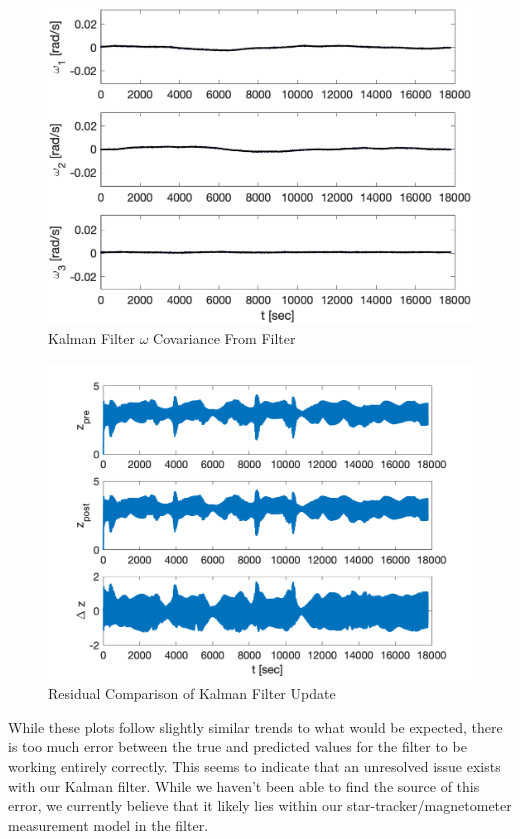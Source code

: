 \begin{figure}[H]
    \centering
    \captionsetup{ justification = centering }
    \includegraphics[width = 12cm]{Images/PS8/kalman_filter_meas_update_omega_cov_bounds.png}
    \caption{Kalman Filter $\omega$ Covariance From Filter}
    \label{fig:kalman_omega_cov}
\end{figure}

\begin{figure}[H]
    \centering
    \captionsetup{ justification = centering }
    \includegraphics[width = 12cm]{Images/PS8/kalman_filter_meas_update_residual_comparison.png}
    \caption{Residual Comparison of Kalman Filter Update}
    \label{fig:kalman_residual}
\end{figure}

While these plots follow slightly similar trends to what would be expected, there is too much error between the true and predicted values for the filter to be working entirely correctly. This seems to indicate that an unresolved issue exists with our Kalman filter. While we haven't been able to find the source of this error, we currently believe that it likely lies within our star-tracker/magnetometer measurement model in the filter.

